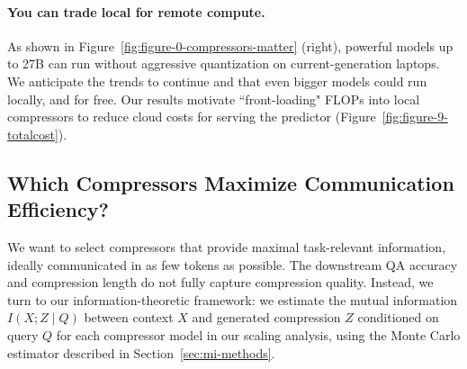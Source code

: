 \documentclass{article} %
\begin{document}
\paragraph*{You can trade local for remote compute.} 
As shown in Figure~\ref{fig:figure-0-compressors-matter} (right), powerful models up to 27B can run without aggressive quantization on current-generation laptops. We anticipate the trends to continue and that even bigger models could run locally, and for free. Our results motivate ``front-loading" FLOPs into local compressors to reduce cloud costs for serving the predictor (Figure~\ref{fig:figure-9-totalcost}).


\subsection{Which Compressors Maximize Communication Efficiency?}
\label{sec:mi-be-scaling}

We want to select compressors that provide maximal task-relevant information, ideally communicated in as few tokens as possible. The downstream QA accuracy and compression length do not fully capture compression quality. Instead, we turn to our information-theoretic framework:
we estimate the mutual information \(I(X;Z \mid Q)\) between context $X$ and generated compression $Z$ conditioned on query $Q$ for each compressor model in our scaling analysis, using the Monte Carlo estimator described in Section~\ref{sec:mi-methods}.
\end{document}
